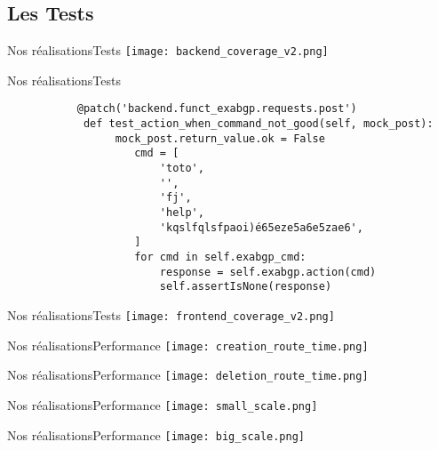 \subsection{Les Tests}

\begin{frame}{Nos réalisations}{Tests}
	\texttt{[image: backend\_coverage\_v2.png]}
\end{frame}

\begin{frame}[fragile]{Nos réalisations}{Tests}
    \begin{minipage}{0.3\textwidth}
        \begin{verbatim}
           @patch('backend.funct_exabgp.requests.post')
            def test_action_when_command_not_good(self, mock_post):
                 mock_post.return_value.ok = False
                    cmd = [
                        'toto',
                        '',
                        'fj',
                        'help',
                        'kqslfqlsfpaoi)é65eze5a6e5zae6',
                    ]
                    for cmd in self.exabgp_cmd:
                        response = self.exabgp.action(cmd)
                        self.assertIsNone(response)
        \end{verbatim}
    \end{minipage}
\end{frame}

\begin{frame}{Nos réalisations}{Tests}
    \texttt{[image: frontend\_coverage\_v2.png]}
\end{frame}

\begin{frame}{Nos réalisations}{Performance}
    \texttt{[image: creation\_route\_time.png]}
\end{frame}

\begin{frame}{Nos réalisations}{Performance}
    \texttt{[image: deletion\_route\_time.png]}
\end{frame}

\begin{frame}{Nos réalisations}{Performance}
    \texttt{[image: small\_scale.png]}
\end{frame}

\begin{frame}{Nos réalisations}{Performance}
    \texttt{[image: big\_scale.png]}
\end{frame}
